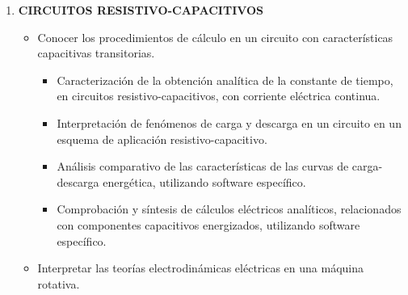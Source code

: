\documentclass[a4paper,12pt]{article}
\begin{document}
\begin{enumerate}[label=\textbf{\arabic*.}, leftmargin=*]
    \item \textbf{CIRCUITOS RESISTIVO-CAPACITIVOS}
    \begin{itemize}[leftmargin=*, nosep]
        \item Conocer los procedimientos de cálculo en un circuito con características capacitivas transitorias.
        \begin{itemize}
            \item Caracterización de la obtención analítica de la constante de tiempo, en circuitos resistivo-capacitivos, con corriente eléctrica continua.
            \item Interpretación de fenómenos de carga y descarga en un circuito en un esquema de aplicación resistivo-capacitivo.
            \item Análisis comparativo de las características de las curvas de carga-descarga energética, utilizando software específico.
            \item Comprobación y síntesis de cálculos eléctricos analíticos, relacionados con componentes capacitivos energizados, utilizando software específico.
        \end{itemize}
        \item Interpretar las teorías electrodinámicas eléctricas en una máquina rotativa.
    \end{itemize}


\end{enumerate}
\end{document}
